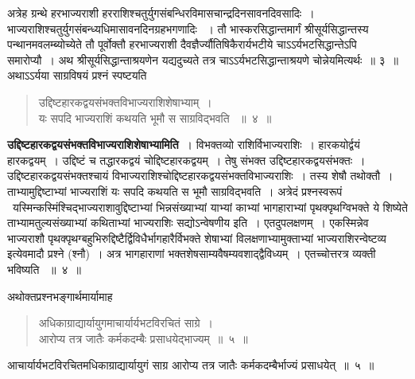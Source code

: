 \documentclass[11pt, openany]{book}
\begin{document}
\indent
अत्रेह ग्रन्थे हरभाज्यराशी हरराशिश्चतुर्युगसंबन्धिरविमासचान्द्रदिनसावनदिवसादिः~। भाज्यराशिश्चतुर्युगसंबन्ध्यधिमासावनदिनग्रहभगणादिः ~। तौ भास्करसिद्धान्तमार्गं श्रीसूर्यसिद्धान्तस्य पन्थानमवलम्ब्योच्येते तौ पूर्वोक्तौ हरभाज्यराशी दैवज्ञैर्ज्यौतिषिकैरार्यभटीये चाऽऽर्यभटसिद्धान्तेऽपि समारोप्यौ~। अथ श्रीसूर्यसिद्धान्ताश्रयणेन यद्यदुच्यते तत्र चाऽऽर्यभटसिद्धान्ताश्रयणे चोन्नेयमित्यर्थः~॥ ३~॥\\
\indent
अथाऽऽर्यया साग्रविषयं प्रश्नं स्पष्टयति \textendash

\begin{quote}
\ks
उद्दिष्टहारकद्वयसंभक्तविभाज्यराशिशेषाभ्याम्~।\\
यः सपदि भाज्यराशिं कथयति भूमौ स साग्रविद्भवति ~॥~४~॥
\end{quote}
\indent
\textbf{उद्दिष्टहारकद्वयसंभक्तविभाज्यराशिशेषाभ्यामिति~}। विभक्तव्यो राशिर्विभाज्यराशिः~। हारकयोर्द्वयं हारकद्वयम्~। उद्दिष्टं च तद्धारकद्वयं चोद्दिष्टहारकद्वयम्~। तेषु संभक्त उद्दिष्टहारकद्वयसंभक्तः~। उद्दिष्टहारकद्वयसंभक्तश्चायं विभाज्यराशिश्चोद्दिष्टहारकद्वयसंभक्तविभाज्यराशिः~। तस्य शेषौ तथोक्तौ~। ताभ्यामुद्दिष्टाभ्यां भाज्यराशिं यः सपदि कथयति स भूमौ साग्रविद्भवति~। अत्रेदं
प्रश्नस्वरूपं \textendash\ यस्मिन्कस्मिंश्चिद्भाज्यराशावुद्दिष्टाभ्यां भिन्नसंख्याभ्यां याभ्यां काभ्यां भागहाराभ्यां पृथक्पृथग्विभक्ते ये शिष्येते ताभ्यामतुल्यसंख्याभ्यां कथिताभ्यां भाज्यराशिः सद्योऽन्वेषणीय इति~। एतदुपलक्षणम्~। एकस्मिन्नेव भाज्यराशौ पृथक्पृथग्बहुभिरुद्दिष्टैर्द्विविधैर्भागहारैर्विभक्ते शेषाभ्यां विलक्षणाभ्यामुक्ताभ्यां
भाज्यराशिरन्वेष्टव्य इत्येवमादौ प्रश्ने (श्नौ)~। अत्र भागहाराणां भक्तशेषसाम्यवैषम्यवशाद्द्वैविध्यम्~। एतच्चोत्तरत्र व्यक्ती भविष्यति ~॥~४~॥

\newpage
\thispagestyle{fancy}
\fancyhf{}
\indent
अथोक्तप्रश्नभङ्गार्थमार्यामाह \textendash
\begin{quote}
\ks
अधिकाग्राद्यार्यायुगमाचार्यार्यभटविरचितं साग्रे~।\\
आरोप्य तत्र जातैः कर्मकदम्बैः प्रसाधयेद्भाज्यम्~॥~५~॥
\end{quote}

\indent
आचार्यार्यभटविरचितमधिकाग्राद्यार्यायुगं साग्र आरोप्य तत्र जातैः कर्मकदम्बैर्भाज्यं प्रसाधयेत्~॥~५~॥\\
\end{document}
